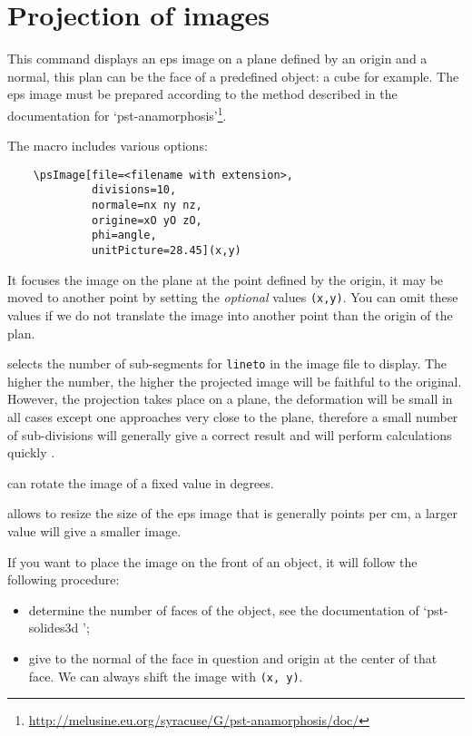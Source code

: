 \section{Projection of images}


This command displays an eps image on a plane defined by an origin and a normal, this plan can be the face 
of a predefined object: a  cube for example. The eps image must be prepared according to the method 
described in the documentation for 
`\textsf{pst-anamorphosis'}\footnote{\url{http://melusine.eu.org/syracuse/G/pst-anamorphosis/doc/}}.

The macro includes various options:
\begin{verbatim}
    \psImage[file=<filename with extension>,
             divisions=10,
             normale=nx ny nz,
             origine=xO yO zO,
             phi=angle,
             unitPicture=28.45](x,y)
\end{verbatim}
It focuses the image on the plane at the point defined by the origin, it may be moved to another point 
by setting the \emph{optional} values \verb+(x,y)+. You can omit these values 
if we do not translate the image into another point than the origin of the plan.

selects the number of sub-segments for \texttt{lineto} in the image file to display. The higher the number, 
the higher the projected image will be faithful to the original. However, the projection takes place on a 
plane, the deformation will be small in all cases except one approaches very close to the plane, therefore 
a small number of sub-divisions will generally give a correct result and will perform calculations quickly .

 can rotate the image of a fixed 
value in degrees.

allows to resize the size of the eps image that is generally points per cm, a larger value will give a smaller image.

If you want to place the image on the front of an object, it will follow the following procedure:
\begin{itemize}
   \item determine the number of faces of the object, see the documentation of `\textsf{pst-solides3d} ';
   \item give to the normal of the face in question and origin at the center of that face. We can always 
   shift the image with \verb+(x, y)+.
\end{itemize}

